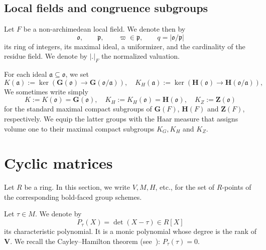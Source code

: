 \documentclass[reqno]{amsart}
\theoremstyle{plain} \newtheorem{theorem} {Theorem} \newtheorem{conjecture} {Conjecture} \newtheorem{corollary} [theorem] {Corollary} \newtheorem{proposition} [theorem] {Proposition} \newtheorem{fact} [theorem] {Fact}
\theoremstyle{definition} \newtheorem{definition} [theorem] {Definition}
\theoremstyle{itplain} %
\begin{document}
\subsection{Local fields and congruence subgroups}\label{sec:local-fields-congruence-subgroups}
Let $F$ be a non-archimedean local field.  We denote then by
\begin{equation*}
  \mathfrak{o}, \qquad \mathfrak{p}, \qquad \varpi \in \mathfrak{p} ,\qquad q = \lvert \mathfrak{o} / \mathfrak{p}  \rvert
\end{equation*}
its ring of integers, its maximal ideal, a uniformizer, and the cardinality of the residue field.  We denote by $|.|_F$ the normalized valuation.

For each ideal $\mathfrak{a} \subseteq \mathfrak{o}$, we set
\begin{equation}\label{eqn:cj3m0de4ie}
  K(\mathfrak{a}) := \ker(\mathbf{G}(\mathfrak{o}) \rightarrow \mathbf{G}(\mathfrak{o}/\mathfrak{a})),
  \quad
  K_H(\mathfrak{a}) := \ker(\mathbf{H}(\mathfrak{o}) \rightarrow \mathbf{H}(\mathfrak{o}/\mathfrak{a})),
\end{equation}
We sometimes write simply
\begin{equation*}
  K := K(\mathfrak{o}) = \mathbf{G}(\mathfrak{o}), \quad K_H := K_H(\mathfrak{o}) = \mathbf{H}(\mathfrak{o}),
  \quad
  K_Z := \mathbf{Z}(\mathfrak{o})
\end{equation*}
for the standard maximal compact subgroups of $\mathbf{G}(F)$, $\mathbf{H}(F)$ and $\mathbf{Z}(F)$, respectively.  We equip the latter groups with the Haar measure that assigns volume one to their maximal compact subgroups $K _G, K _H$ and $K _Z$.






\section{Cyclic matrices}\label{sec:cyclic-matrices}
Let $R$ be a ring.  In this section, we write $V, M, H$, etc., for the set of $R$-points of the corresponding bold-faced group schemes.

Let $\tau \in M$.  We denote by
\begin{equation*}
  P_\tau(X) = \det(X - \tau) \in R[X]
\end{equation*}
its characteristic polynomial.  It is a monic polynomial whose degree is the rank of $\mathbf{V}$.  We recall the Cayley--Hamilton theorem (see~\cite[Theorem 4.3]{MR1322960}): $P_\tau(\tau) = 0$.
\end{document}
